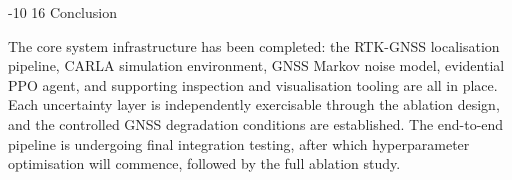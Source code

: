 \documentclass{sig-alternate}
\makeatletter
\renewcommand\section{\@startsection{section}{1}{\z@}%
    {-10\p@ \@plus -4\p@ \@minus -2\p@}%
    {16\p@}%
    {\baselineskip 14pt\secfnt\@ucheadtrue}}
\makeatother
\begin{document}
\section{Conclusion}
\label{sec:conclusion}

The core system infrastructure has been completed: the RTK-GNSS localisation pipeline, CARLA simulation environment, GNSS Markov noise model, evidential PPO agent, and supporting inspection and visualisation tooling are all in place. Each uncertainty layer is independently exercisable through the ablation design, and the controlled GNSS degradation conditions are established. The end-to-end pipeline is undergoing final integration testing, after which hyperparameter optimisation will commence, followed by the full ablation study.


\newpage
{\small
\vspace*{-20pt}


}
\end{document}
